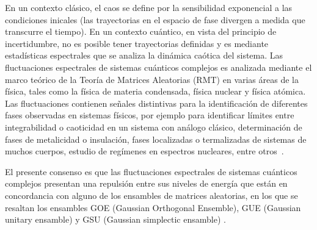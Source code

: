 \documentclass[spanish,titlepage,table]{practicas}
\begin{document}
En un contexto clásico, el caos se define por la sensibilidad exponencial a las condiciones inicales 
(las trayectorias en el espacio de fase divergen a medida que transcurre el tiempo). En un contexto cuántico, en vista del principio de incertidumbre, no es posible tener 
trayectorias definidas y es mediante estadísticas espectrales que se analiza la dinámica caótica del sistema.
Las fluctuaciones espectrales de sistemas cuánticos complejos es analizada mediante 
el marco teórico de la Teoría de Matrices Aleatorias (RMT) en varias áreas de la física, 
tales como la física de materia condensada, física nuclear y física atómica.
Las fluctuaciones contienen señales distintivas para la identificación de diferentes fases observadas 
en sistemas físicos, por ejemplo para identificar límites entre integrabilidad o caoticidad en un sistema con análogo clásico,
determinación de fases de metalicidad o insulación, fases localizadas o termalizadas de sistemas de muchos cuerpos, estudio de regímenes en espectros nucleares, entre otros~\cite{Tekur2020}.


El presente consenso es que las fluctuaciones espectrales de sistemas cuánticos complejos presentan 
una repulsión entre sus niveles de energía que están en concordancia con alguno de los ensambles de matrices 
aleatorias, en los que se resaltan los ensambles GOE (Gaussian Orthogonal Ensemble), GUE (Gaussian unitary ensamble) y GSU (Gaussian simplectic ensamble)
.
\end{document}
